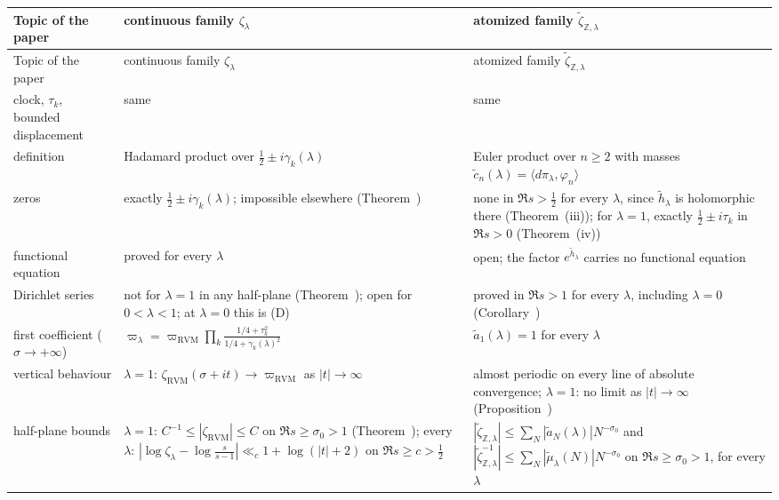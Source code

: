 \documentclass[11pt,reqno]{amsart}
\makeatletter
\let\CG@origref\ref
\let\CG@origeqref\eqref
\newcommand{\CG@gettip}[1]{\@ifundefined{CGTip@#1}{Reference: #1}{\csname CGTip@#1\endcsname}}
\DeclareRobustCommand{\CGref}[1]{\pdftooltip{\CG@origref{#1}}{\CG@gettip{#1}}}
\DeclareRobustCommand{\CGeqref}[1]{\pdftooltip{\CG@origeqref{#1}}{\CG@gettip{#1}}}
\numberwithin{equation}{section}
\theoremstyle{plain}
\theoremstyle{definition}
\theoremstyle{remark}
\newcommand{\Z}{\mathbb Z}
\newcommand{\RVM}{\mathrm{RVM}}
\makeatother
\begin{document}
\begingroup\small
\begin{longtable}{>{\raggedright\arraybackslash}p{}>{\raggedright\arraybackslash}p{}>{\raggedright\arraybackslash}p{}}
\toprule
Topic of the paper & continuous family $\zeta_\lambda$ & atomized family $\tilde\zeta_{\Z,\lambda}$\\
\midrule
\endfirsthead
\toprule
Topic of the paper & continuous family $\zeta_\lambda$ & atomized family $\tilde\zeta_{\Z,\lambda}$\\
\midrule
\endhead
\bottomrule
\endfoot
\addlinespace[2pt]
clock, $\tau_k$, bounded displacement & same & same\\
definition & Hadamard product over $\frac12\pm i\gamma_k(\lambda)$ & Euler product over $n\ge2$ with masses $\tilde c_n(\lambda)=\langle d\pi_\lambda,\varphi_n\rangle$\\
zeros & exactly $\frac12\pm i\gamma_k(\lambda)$; impossible elsewhere (Theorem~\CGref{thm:path}) & none in $\Re s>\frac12$ for every $\lambda$, since $\tilde h_\lambda$ is holomorphic there (Theorem~\CGref{thm:atomized-continuation}(iii)); for $\lambda=1$, exactly $\frac12\pm i\tau_k$ in $\Re s>0$ (Theorem~\CGref{thm:atomized-continuation}(iv))\\
functional equation & proved for every $\lambda$ & open; the factor $e^{\tilde h_\lambda}$ carries no functional equation\\
Dirichlet series & not for $\lambda=1$ in any half-plane (Theorem~\CGref{thm:no-Dirichlet-RVM}); open for $0<\lambda<1$; at $\lambda=0$ this is (D) & proved in $\Re s>1$ for every $\lambda$, including $\lambda=0$ (Corollary~\CGref{cor:abscissa-one})\\
first coefficient ($\sigma\to+\infty$) & $\varpi_\lambda=\varpi_{\RVM}\prod_k\frac{1/4+\tau_k^2}{1/4+\gamma_k(\lambda)^2}$ \CGeqref{eq:varpi-lambda} & $\tilde a_1(\lambda)=1$ for every $\lambda$\\
vertical behaviour & $\lambda=1$: $\zeta_{\RVM}(\sigma+it)\to\varpi_{\RVM}$ as $|t|\to\infty$ \CGeqref{eq:vertical-limit} & almost periodic on every line of absolute convergence; $\lambda=1$: no limit as $|t|\to\infty$ (Proposition~\CGref{prop:atomized-clock})\\
half-plane bounds & $\lambda=1$: $C^{-1}\le|\zeta_{\RVM}|\le C$ on $\Re s\ge\sigma_0>1$ (Theorem~\CGref{thm:halfplane-RVM}); every $\lambda$: $|\log\zeta_\lambda-\log\frac s{s-1}|\ll_c1+\log(|t|+2)$ on $\Re s\ge c>\frac12$ & $|\tilde\zeta_{\Z,\lambda}|\le\sum_N|\tilde a_N(\lambda)|N^{-\sigma_0}$ and $|\tilde\zeta_{\Z,\lambda}^{-1}|\le\sum_N|\tilde\mu_\lambda(N)|N^{-\sigma_0}$ on $\Re s\ge\sigma_0>1$, for every $\lambda$\\

\end{longtable}
\end{document}
